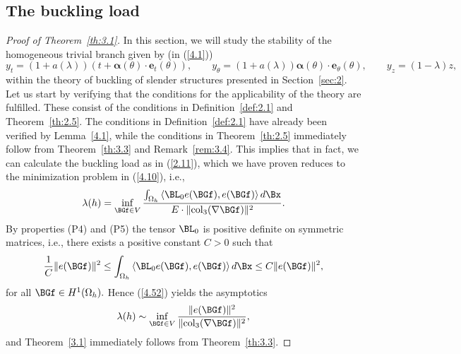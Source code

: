 







\subsection{The buckling load}
\label{sec:4.4}


\begin{proof}[Proof of Theorem~\ref{th:3.1}] 
In this section, we will study the stability of the homogeneous trivial branch given by (in (\ref{4.1}))
\begin{equation}
\label{4.54}
y_t=(1+a(\lambda))(t+\bm\alpha(\theta)\cdot \bm e_t(\theta)), \qquad y_\theta=(1+a(\lambda))\bm\alpha(\theta)\cdot \bm e_\theta(\theta), \qquad y_z=(1-\lambda)z, 
\end{equation}
within the theory of buckling of slender structures presented in Section~\ref{sec:2}. Let us start by verifying that the conditions for the applicability of the theory are fulfilled. These consist of the conditions in Definition~\ref{def:2.1} and Theorem~\ref{th:2.5}. The conditions in Definition~\ref{def:2.1} have already been verified by 
Lemma~\ref{4.1}, while the conditions in Theorem~\ref{th:2.5} immediately follow from Theorem~\ref{th:3.3} and Remark~\ref{rem:3.4}. This implies that in fact, we can 
calculate the buckling load as in (\ref{2.11}), which we have proven reduces to the minimization problem in (\ref{4.10}), i.e., 
\begin{equation}
\label{4.55}
\Gl(h)=\inf_{\BGf\in V} \frac{\int_{\Omega_h} \left\langle \BL_{0} e(\BGf), e(\BGf)\right\rangle d\Bx}{E\cdot \|\mathrm{col}_3(\nabla\BGf)\|^{2}}.
\end{equation}
By properties (P4) and (P5) the tensor $\BL_0$ is positive definite on symmetric matrices, i.e., there exists a positive constant $C>0$ such that 
$$\frac{1}{C}\|e(\BGf)\|^2\leq \int_{\Omega_h} \left\langle \BL_{0} e(\BGf), e(\BGf)\right\rangle d\Bx \leq C\|e(\BGf)\|^2,$$
for all $\BGf\in H^1(\Omega_h).$ Hence (\ref{4.52}) yields the asymptotics 
\begin{equation}
\label{4.56}
\Gl(h)\sim \inf_{\BGf\in V} \frac{\|e(\BGf)\|^2}{\|\mathrm{col}_3(\nabla\BGf)\|^{2}}, 
\end{equation}
and Theorem~\ref{3.1} immediately follows from Theorem~\ref{th:3.3}. 

\end{proof}




